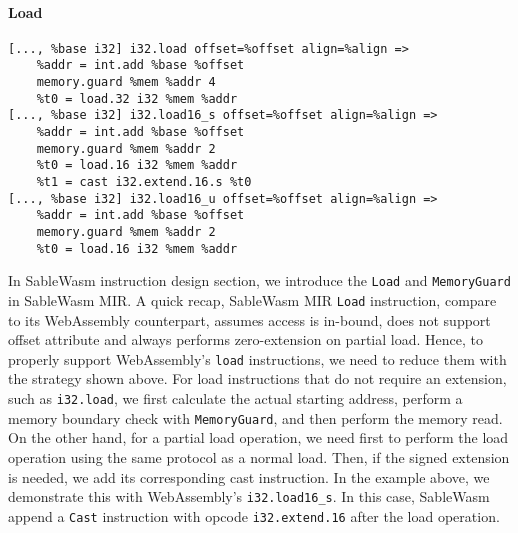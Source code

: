\paragraph{Load} \quad
\begin{lstlisting}[basicstyle=\linespread{1}\small\ttfamily, language=SableWasmMIR]
[..., %base i32] i32.load offset=%offset align=%align =>
    %addr = int.add %base %offset
    memory.guard %mem %addr 4
    %t0 = load.32 i32 %mem %addr
[..., %base i32] i32.load16_s offset=%offset align=%align =>
    %addr = int.add %base %offset
    memory.guard %mem %addr 2
    %t0 = load.16 i32 %mem %addr
    %t1 = cast i32.extend.16.s %t0
[..., %base i32] i32.load16_u offset=%offset align=%align =>
    %addr = int.add %base %offset
    memory.guard %mem %addr 2
    %t0 = load.16 i32 %mem %addr
\end{lstlisting}
In SableWasm instruction design section, we introduce the \texttt{Load} and \texttt{MemoryGuard} in SableWasm MIR. A quick recap, SableWasm MIR \texttt{Load} instruction, compare to its WebAssembly counterpart, assumes access is in-bound, does not support offset attribute and always performs zero-extension on partial load. Hence, to properly support WebAssembly's \texttt{load} instructions, we need to reduce them with the strategy shown above. For load instructions that do not require an extension, such as \texttt{i32.load}, we first calculate the actual starting address, perform a memory boundary check with \texttt{MemoryGuard}, and then perform the memory read. On the other hand, for a partial load operation, we need first to perform the load operation using the same protocol as a normal load. Then, if the signed extension is needed, we add its corresponding cast instruction. In the example above, we demonstrate this with WebAssembly's \texttt{i32.load16\_s}. In this case, SableWasm append a \texttt{Cast} instruction with opcode \texttt{i32.extend.16} after the load operation.


